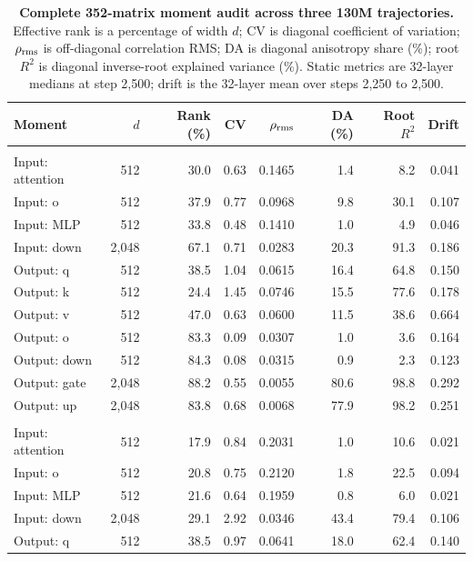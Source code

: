 \begin{table}[tbp]\centering\footnotesize
\setlength{\tabcolsep}{8.0pt}
\caption{\textbf{Complete 352-matrix moment audit across three 130M trajectories.} Effective rank is a percentage of width $d$; CV is diagonal coefficient of variation; $\rho_{\rm rms}$ is off-diagonal correlation RMS; DA is diagonal anisotropy share (\%); root $R^2$ is diagonal inverse-root explained variance (\%). Static metrics are 32-layer medians at step 2,500; drift is the 32-layer mean over steps 2,250 to 2,500.}\label{tab:diagnosis}
\begin{tabularx}{\textwidth}{@{}>{\raggedright\arraybackslash}Xrrrrrrr@{}}
\toprule
Moment & $d$ & Rank (\%) & CV & $\rho_{\rm rms}$ & DA (\%) & Root $R^2$ & Drift \\
\midrule
\addlinespace[2pt]\multicolumn{8}{@{}l}{\textit{Muon}}\\
Input: attention & 512 & 30.0 & 0.63 & 0.1465 & 1.4 & 8.2 & 0.041 \\
Input: o & 512 & 37.9 & 0.77 & 0.0968 & 9.8 & 30.1 & 0.107 \\
Input: MLP & 512 & 33.8 & 0.48 & 0.1410 & 1.0 & 4.9 & 0.046 \\
Input: down & 2,048 & 67.1 & 0.71 & 0.0283 & 20.3 & 91.3 & 0.186 \\
Output: q & 512 & 38.5 & 1.04 & 0.0615 & 16.4 & 64.8 & 0.150 \\
Output: k & 512 & 24.4 & 1.45 & 0.0746 & 15.5 & 77.6 & 0.178 \\
Output: v & 512 & 47.0 & 0.63 & 0.0600 & 11.5 & 38.6 & 0.664 \\
Output: o & 512 & 83.3 & 0.09 & 0.0307 & 1.0 & 3.6 & 0.164 \\
Output: down & 512 & 84.3 & 0.08 & 0.0315 & 0.9 & 2.3 & 0.123 \\
Output: gate & 2,048 & 88.2 & 0.55 & 0.0055 & 80.6 & 98.8 & 0.292 \\
Output: up & 2,048 & 83.8 & 0.68 & 0.0068 & 77.9 & 98.2 & 0.251 \\
\addlinespace[4pt]\multicolumn{8}{@{}l}{\textit{MuonT}}\\
Input: attention & 512 & 17.9 & 0.84 & 0.2031 & 1.0 & 10.6 & 0.021 \\
Input: o & 512 & 20.8 & 0.75 & 0.2120 & 1.8 & 22.5 & 0.094 \\
Input: MLP & 512 & 21.6 & 0.64 & 0.1959 & 0.8 & 6.0 & 0.021 \\
Input: down & 2,048 & 29.1 & 2.92 & 0.0346 & 43.4 & 79.4 & 0.106 \\
Output: q & 512 & 38.5 & 0.97 & 0.0641 & 18.0 & 62.4 & 0.140 \\

\end{tabularx}
\end{table}
